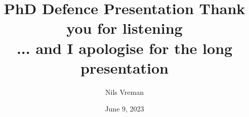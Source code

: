 \documentclass[aspectratio=169]{beamer}
\title[PhD Defence]{%
    \Huge PhD Defence Presentation
}
\author[Nils Vreman]{%
    \vspace{1cm}
    \LARGE Nils Vreman
}
\date[June 9]{%
    \vspace{5mm}
    June 9, 2023
}
\begin{document}
 
\logooff{}













\title[Preperatory Seminar]{%
    {\Huge Thank you for listening}\\
    {\tiny ... and I apologise for the long presentation}
}
\author[Nils Vreman]{}
\date[]{}
\notitlelogo{}


\extraframesbegin{}

\extraframesend{}
\logoon{}
\end{document}
